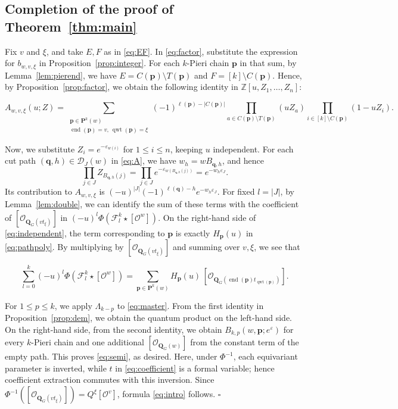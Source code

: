 \documentclass[11pt,a4paper,reqno]{amsart}
\DeclareRobustCommand{\rev}[1]{{\color{revision}#1}}
\newenvironment{revisiontext}{\par\begingroup\color{revision}}{\par\endgroup}
\numberwithin{equation}{section}
\theoremstyle{definition}
\DeclareMathOperator{\End}{end}
\DeclareMathOperator{\qwt}{qwt}
\newcommand{\Z}{\mathbb Z}
\newcommand{\QG}{\mathbf Q_G}
\newcommand{\OO}{\mathcal O}
\newcommand{\Sc}[1]{[\OO^{#1}]}
\newcommand{\Si}[1]{[\OO_{\QG(#1)}]}
\newcommand{\Pieri}{\mathbf P}
\newcommand{\pp}{\mathbf p}
\newcommand{\qq}{\mathbf q}
\newcommand{\eps}{\varepsilon}
\newcommand{\FF}{\mathcal F}
\begin{document}
\subsection{Completion of the proof of Theorem~\ref{thm:main}}
\begin{revisiontext}
\rev{Fix \(v\) and \(\xi\), and take \(E,F\) as in \eqref{eq:EF}. In \eqref{eq:factor}, substitute the expression for \(b_{w,v,\xi}\) in Proposition~\ref{prop:integer}. For each \(k\)-Pieri chain \(\pp\) in that sum, by Lemma~\ref{lem:pierend}, we have \(E=C(\pp)\setminus T(\pp)\) and \(F=[k]\setminus C(\pp)\). Hence, by Proposition~\ref{prop:factor}, we obtain the following identity in \(\Z[u,Z_1,\ldots,Z_n]\):}
\end{revisiontext}
\begin{equation}\label{eq:independent}
 A_{w,v,\xi}(u;Z)=
 \sum_{\substack{\pp\in\Pieri^k(w)\\ \End(\pp)=v,\ \qwt(\pp)=\xi}}
 (-1)^{\ell(\pp)-|C(\pp)|}
 \prod_{a\in C(\pp)\setminus T(\pp)}(uZ_a)
 \prod_{i\in[k]\setminus C(\pp)}(1-uZ_i).
\end{equation}
\begin{revisiontext}
Now, we substitute \(Z_i=e^{-\eps_{w(i)}}\) for \(1 \le i \le n\), keeping \(u\) independent. For each cut path \((\qq, h) \in \mathcal{D}_J(w)\) in \eqref{eq:A}, we have \(w_h=wB_{\qq,h}\), and hence 
\[
 \prod_{j\in J} Z_{B_{\qq,h}(j)}
   =\prod_{j\in J} e^{-\eps_{w(B_{\qq,h}(j))}}
   =e^{-w_h\eps_J}.
\]
Its contribution to \(A_{w,v,\xi}\) is
\((-u)^{|J|}(-1)^{\ell(\qq)-h}e^{-w_h\eps_J}\).
For fixed \(l=|J|\), by Lemma~\ref{lem:double}, we can identify the sum of these terms with the coefficient of \(\Si{vt_\xi}\) in \((-u)^l\Phi(\FF_l^k\star\Sc{w})\). On the right-hand side of \eqref{eq:independent}, the term corresponding to \(\pp\) is exactly \(H_{\pp}(u)\) in \eqref{eq:pathpoly}. By multiplying by \(\Si{vt_\xi}\) and summing over \(v,\xi\), we see that 
\end{revisiontext}
\begin{equation}\label{eq:master}
 \sum_{l=0}^k(-u)^l\Phi(\FF^k_l\star\Sc{w})
  =\sum_{\pp\in\Pieri^k(w)} H_{\pp}(u)\,\Si{\End(\pp)t_{\qwt(\pp)}} .
\end{equation}
\begin{revisiontext}
For \(1\le p\le k\), we apply \(\Lambda_{k-p}\) to \eqref{eq:master}. From the first identity in Proposition~\ref{prop:dem}, we obtain the quantum product on the left-hand side. On the right-hand  side, from the second identity, we obtain \(B_{k,p}(w,\pp;e^\eps)\) for every \(k\)-Pieri chain and one additional \(\Si{w}\) from the constant term of the empty path. This proves \eqref{eq:semi}, as desired. Here, under \(\Phi^{-1}\), each equivariant parameter is inverted, while \(t\) in \eqref{eq:coefficient} is a formal variable; hence coefficient extraction commutes with this inversion. Since \(\Phi^{-1}(\Si{vt_\xi})=Q^\xi\Sc{v}\), formula \eqref{eq:intro} follows. \hfill\(\square\)
\end{revisiontext}
\end{document}
